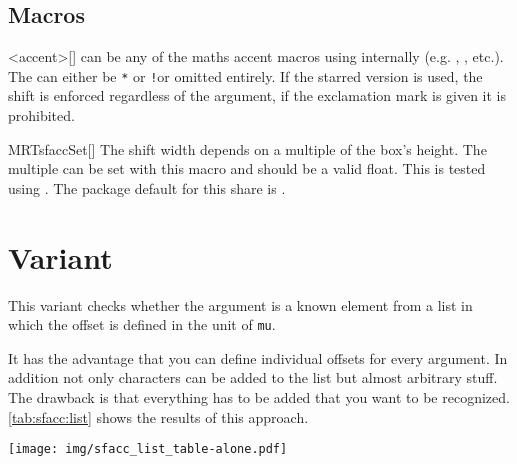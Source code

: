 \subsection{Macros}\label{sec:sfacc:height:macros}%
\begin{describemacro}{<accent>}[\meta{*/!}]%
   can be any of the maths accent macros using 
  internally (e.g. , , etc.).\\
  The \meta{*/!} can either be \texttt{*} or \texttt{!}\@ or omitted entirely.
  If the starred version is used, the shift is enforced regardless of the
  argument, if the exclamation mark is given it is prohibited.
\end{describemacro}%

\begin{describemacro}{MRTsfaccSet}[]%
  The shift width depends on a multiple of the box's height. The multiple can be
  set with this macro and should be a valid float. This is tested using
  . The package default for this share is
  \makeatletter\texttt{\MRTsfacc@share}\makeatother.
\end{describemacro}%

\section{ Variant}\label{sec:sfacc:list}%
This variant checks whether the argument is a known element from a list in which
the offset is defined in the unit of \texttt{mu}.

It has the advantage that you can define individual offsets for every argument.
In addition not only characters can be added to the list but almost arbitrary
stuff. The drawback is that everything has to be added that you want to be
recognized.
\autoref{tab:sfacc:list} shows the results of this approach.

\begin{MRTtable}%
  [
    ,env={}
    ,label=tab:sfacc:list
    ,caption=
      {%
        Comparison of shifted accents against original placement with the use of
        the \opt{list} variant.%
      }%
  ]
  \texttt{[image: img/sfacc\_list\_table-alone.pdf]}
\end{MRTtable}%


